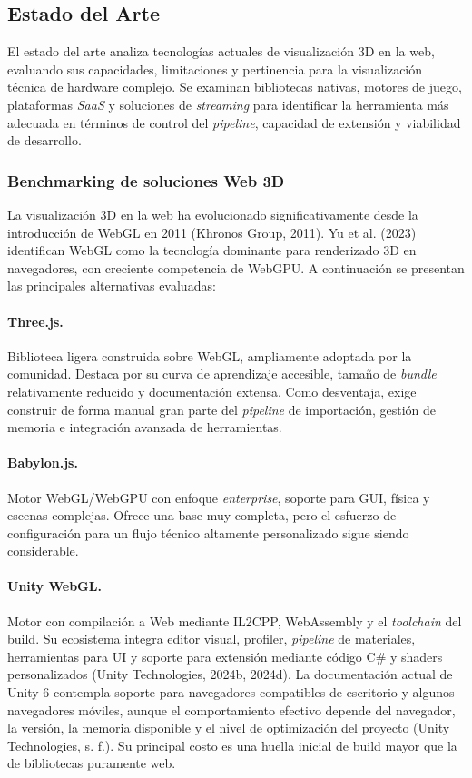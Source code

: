 \subsection{Estado del Arte}

El estado del arte analiza tecnolog\'ias actuales de visualizaci\'on 3D en la web, evaluando sus capacidades, limitaciones y pertinencia para la visualizaci\'on t\'ecnica de hardware complejo. Se examinan bibliotecas nativas, motores de juego, plataformas \textit{SaaS} y soluciones de \textit{streaming} para identificar la herramienta m\'as adecuada en t\'erminos de control del \textit{pipeline}, capacidad de extensi\'on y viabilidad de desarrollo.

\subsubsection{Benchmarking de soluciones Web 3D}

La visualizaci\'on 3D en la web ha evolucionado significativamente desde la introducci\'on de WebGL en 2011 (Khronos Group, 2011). Yu et al. (2023) identifican WebGL como la tecnolog\'ia dominante para renderizado 3D en navegadores, con creciente competencia de WebGPU. A continuaci\'on se presentan las principales alternativas evaluadas:

\paragraph{Three.js.} Biblioteca ligera construida sobre WebGL, ampliamente adoptada por la comunidad. Destaca por su curva de aprendizaje accesible, tama\~no de \textit{bundle} relativamente reducido y documentaci\'on extensa. Como desventaja, exige construir de forma manual gran parte del \textit{pipeline} de importaci\'on, gesti\'on de memoria e integraci\'on avanzada de herramientas.

\paragraph{Babylon.js.} Motor WebGL/WebGPU con enfoque \textit{enterprise}, soporte para GUI, f\'isica y escenas complejas. Ofrece una base muy completa, pero el esfuerzo de configuraci\'on para un flujo t\'ecnico altamente personalizado sigue siendo considerable.

\paragraph{Unity WebGL.} Motor con compilaci\'on a Web mediante IL2CPP, WebAssembly y el \textit{toolchain} del build. Su ecosistema integra editor visual, profiler, \textit{pipeline} de materiales, herramientas para UI y soporte para extensi\'on mediante c\'odigo C\# y shaders personalizados (Unity Technologies, 2024b, 2024d). La documentaci\'on actual de Unity 6 contempla soporte para navegadores compatibles de escritorio y algunos navegadores m\'oviles, aunque el comportamiento efectivo depende del navegador, la versi\'on, la memoria disponible y el nivel de optimizaci\'on del proyecto (Unity Technologies, s. f.). Su principal costo es una huella inicial de build mayor que la de bibliotecas puramente web.

